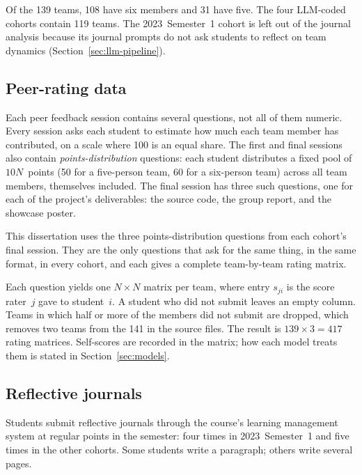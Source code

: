 Of the 139 teams, 108 have six members and 31 have five. The four LLM-coded
cohorts contain 119 teams. The 2023~Semester~1 cohort is left out of the journal
analysis because its journal prompts do not ask students to reflect on team
dynamics (Section~\ref{sec:llm-pipeline}).

\subsection{Peer-rating data}
\label{sec:peer-data}

Each peer feedback session contains several questions, not all of them numeric.
Every session asks each student to estimate how much each team member has
contributed, on a scale where 100 is an equal share. The first and final
sessions also contain \emph{points-distribution} questions: each student
distributes a fixed pool of $10N$~points (50 for a five-person team, 60 for a
six-person team) across all team members, themselves included. The final
session has three such questions, one for each of the project's deliverables:
the source code, the group report, and the showcase poster.

This dissertation uses the three points-distribution questions from each
cohort's final session. They are the only questions that ask for the same
thing, in the same format, in every cohort, and each gives a complete
team-by-team rating matrix. 

Each question yields one $N \times N$ matrix per team, where entry $s_{ji}$ is
the score rater~$j$ gave to student~$i$. A student who did not submit leaves an
empty column. Teams in which half or more of the members did not submit are
dropped, which removes two teams from the 141 in the source files. The result is
$139 \times 3 = 417$ rating matrices. Self-scores are recorded in the matrix;
how each model treats them is stated in Section~\ref{sec:models}.

\subsection{Reflective journals}
\label{sec:journal-data}

Students submit reflective journals through the course's learning management
system at regular points in the semester: four times in 2023~Semester~1 and
five times in the other cohorts.  Some
students write a paragraph; others write several pages.

